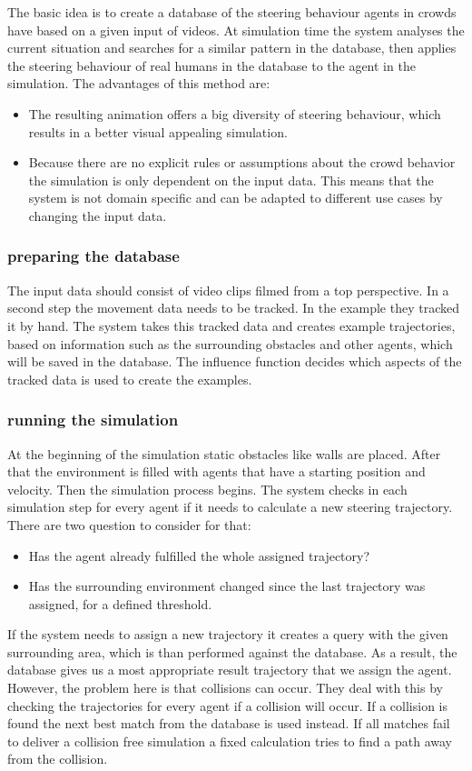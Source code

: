 \documentclass{acmsiggraph}               %
\begin{document}
The basic idea is to create a database of the steering behaviour agents in crowds have based on a given input of videos. At simulation time the system analyses the current situation and searches for a similar pattern in the database, then applies the steering behaviour of real humans in the database to the agent in the simulation. The advantages of this method are: 
\begin{itemize}
    \item The resulting animation offers a big diversity of steering behaviour, which results in a better visual appealing simulation.
    \item Because there are no explicit rules or assumptions about the crowd behavior the simulation is only dependent on the input data. This means that the system is not domain specific and can be adapted to different use cases by changing the input data.
\end{itemize}

\subsubsection{preparing the database}
The input data should consist of video clips filmed from a top perspective. In a second step the movement data needs to be tracked. In the example they tracked it by hand.
The system takes this tracked data and creates example trajectories, based on information such as the surrounding obstacles and other agents, which will be saved in the database. The influence function decides which aspects of the tracked data is used to create the examples. 

\subsubsection{running the simulation}
At the beginning of the simulation static obstacles like walls are placed. After that the environment is filled with agents that have a starting position and velocity. Then the simulation process begins.
The system checks in each simulation step for every agent if it needs to calculate a new steering trajectory. There are two question to consider for that: 
\begin{itemize}
    \item Has the agent already fulfilled the whole assigned trajectory?
    \item Has the surrounding environment changed since the last trajectory was assigned, for a defined threshold.
\end{itemize}
If the system needs to assign a new trajectory it creates a query with the given surrounding area, which is than performed against the database. As a result, the database gives us a most appropriate result trajectory that we assign the agent. 
However, the problem here is that collisions can occur. They deal with this by checking the trajectories for every agent if a collision will occur. If a collision is found the next best match from the database is used instead. If all matches fail to deliver a collision free simulation a fixed calculation tries to find a path away from the collision. 
\end{document}
